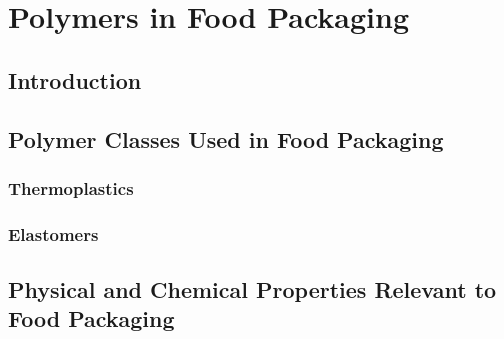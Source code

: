 \section*{Polymers in Food Packaging}

\subsection{Introduction}

\subsection{Polymer Classes Used in Food Packaging}

\subsubsection{Thermoplastics}

\subsubsection{Elastomers}

\subsection{Physical and Chemical Properties Relevant to Food Packaging}

